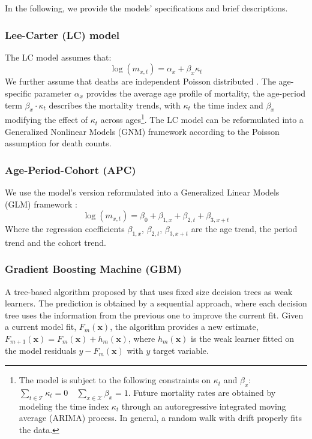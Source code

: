 \documentclass[fleqn,10pt]{wlscirep}
\begin{document}
In the following, we provide the models' specifications and brief descriptions.

\subsubsection*{Lee-Carter (LC) model}
The LC model\cite{LC92} assumes that:
\begin{equation} 
\label{eq:LC}
\log{\left(m_{x,t}\right)}=\alpha_{x}+\beta_{x} \kappa_{t}
\end{equation}
We further assume that deaths are independent Poisson distributed \cite{BDV2002}.
The age-specific parameter $\alpha_x$ provides the average age profile of mortality, the age-period term $\beta_{x}\cdot\kappa_t$ describes the mortality trends, with $\kappa_t$ the time index and $\beta_{x}$ modifying the effect of $\kappa_t$ across ages\footnote{
The model is subject to the following constraints on $\kappa_t$ and $\beta_x$: $\sum_{t \in \mathcal{T}}{\kappa_t}=0 \quad \sum_{x \in \mathcal{X}}{\beta_x}=1$.
Future mortality rates are obtained by modeling the time index $\kappa_{t}$ through an autoregressive integrated moving average (ARIMA) process. In general, a random walk with drift properly fits the data. 
}.
The LC model can be reformulated into a Generalized Nonlinear Models (GNM) framework according to the Poisson assumption for death counts.

\subsubsection*{Age-Period-Cohort (APC)}
We use the model's version reformulated into a Generalized Linear Models (GLM) framework \cite{Alai2014}:
\begin{equation} 
\label{eq:APC}
\log{\left(m_{x,t}\right)}=\beta_{0} +\beta_{1,x}+\beta_{2,t} +\beta_{3,x+t}
\end{equation}
Where the regression coefficients $\beta_{1,x}$, $\beta_{2,t}$, $\beta_{3,x+t}$ are the age trend, the period trend and the cohort trend.

\subsubsection*{Gradient Boosting Machine (GBM)}
A tree-based algorithm proposed by \cite{Friedman} that uses fixed size decision trees as weak learners. The prediction is obtained by a sequential approach, where each decision tree uses the information from the previous one to improve the current fit. Given a current model fit, $F_{m}(\mathbf{x})$, the algorithm provides a new estimate, $F_{m+1}(\mathbf{x})=F_{m}(\mathbf{x})+ h_m(\mathbf{x})$, where $h_m(\mathbf{x})$ is the weak learner fitted on the model residuals $y-F_{m}(\mathbf{x})$ with $y$ target variable.
\end{document}
